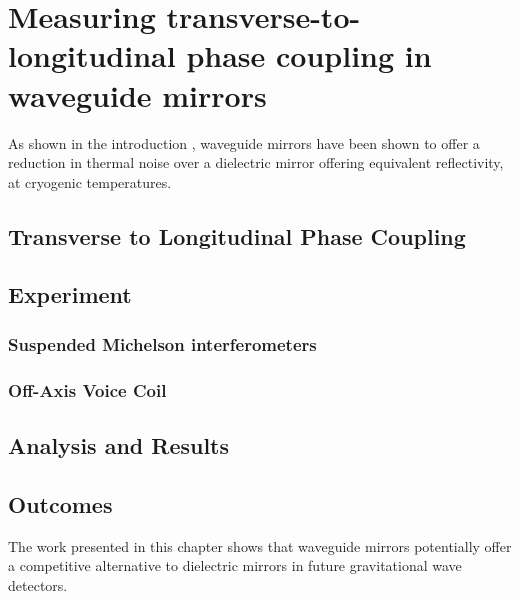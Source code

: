 \chapter{Measuring transverse-to-longitudinal phase coupling in waveguide mirrors}
\label{c:waveguides}

As shown in the introduction , waveguide mirrors have been shown to offer a reduction in thermal noise over a dielectric mirror offering equivalent reflectivity, at cryogenic temperatures.


\section{Transverse to Longitudinal Phase Coupling}

\section{Experiment}

\subsection{Suspended Michelson interferometers}

\subsection{Off-Axis Voice Coil}

\section{Analysis and Results}

\section{Outcomes}

The work presented in this chapter shows that waveguide mirrors potentially offer a competitive alternative to dielectric mirrors in future gravitational wave detectors.

